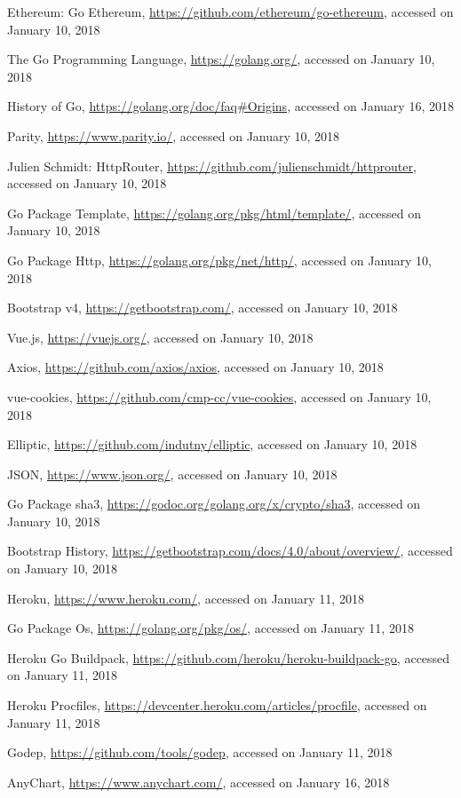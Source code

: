 \begin{thebibliography}{99}
 Ethereum: Go Ethereum, \url{https://github.com/ethereum/go-ethereum}, accessed on January 10, 2018

 The Go Programming Language, \url{https://golang.org/}, accessed on January 10, 2018

 History of Go, \url{https://golang.org/doc/faq#Origins}, accessed on January 16, 2018

 Parity, \url{https://www.parity.io/}, accessed on January 10, 2018

 Julien Schmidt: HttpRouter, \url{https://github.com/julienschmidt/httprouter}, accessed on January 10, 2018

 Go Package Template, \url{https://golang.org/pkg/html/template/}, accessed on January 10, 2018

 Go Package Http, \url{https://golang.org/pkg/net/http/}, accessed on January 10, 2018

 Bootstrap v4, \url{https://getbootstrap.com/}, accessed on January 10, 2018

 Vue.js, \url{https://vuejs.org/}, accessed on January 10, 2018

 Axios, \url{https://github.com/axios/axios}, accessed on January 10, 2018

 vue-cookies, \url{https://github.com/cmp-cc/vue-cookies}, accessed on January 10, 2018

 Elliptic, \url{https://github.com/indutny/elliptic}, accessed on January 10, 2018

 JSON, \url{https://www.json.org/}, accessed on January 10, 2018

 Go Package sha3, \url{https://godoc.org/golang.org/x/crypto/sha3}, accessed on January 10, 2018

 Bootstrap History, \url{https://getbootstrap.com/docs/4.0/about/overview/}, accessed on January 10, 2018

 Heroku, \url{https://www.heroku.com/}, accessed on January 11, 2018

 Go Package Os, \url{https://golang.org/pkg/os/}, accessed on January 11, 2018

 Heroku Go Buildpack, \url{https://github.com/heroku/heroku-buildpack-go}, accessed on January 11, 2018

 Heroku Procfiles, \url{https://devcenter.heroku.com/articles/procfile}, accessed on January 11, 2018

 Godep, \url{https://github.com/tools/godep}, accessed on January 11, 2018

 AnyChart, \url{https://www.anychart.com/}, accessed on January 16, 2018

\end{thebibliography}

